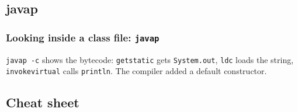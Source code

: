 \documentclass[aspectratio=169,10pt,compress]{beamer}
\begin{document}
\subsection[Javap]{javap}




\begin{frame}[t,fragile] \frametitle{Looking inside a class file: \texttt{javap}}

  \vspace{0.2em}
  \small \texttt{javap -c} shows the bytecode: \texttt{getstatic} gets \texttt{System.out}, \texttt{ldc} loads the string,
  \texttt{invokevirtual} calls \texttt{println}. The compiler added a default constructor.
\end{frame}


\subsection[Cheat sheet]{Cheat sheet}
\end{document}
